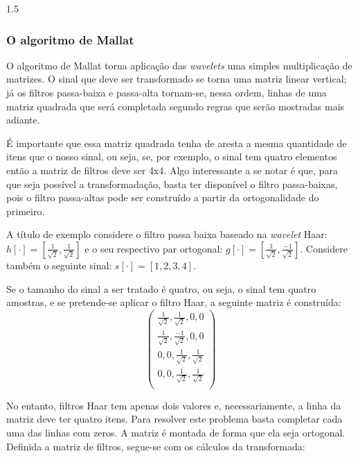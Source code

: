 \documentclass[a4paper,12pt,openright,oneside]{book}
\newenvironment{myenv}[1]
{\begin{spacing}{#1}}
	{\end{spacing}}
\begin{document}
\begin{myenv}{1.5}
\subsubsection{O algoritmo de Mallat}
\par O algoritmo de Mallat torna aplicação das \textit{wavelets} uma simples multiplicação de matrizes. O sinal que deve ser transformado se torna uma matriz linear vertical; já os filtros passa-baixa e passa-alta tornam-se, nessa ordem, linhas de uma matriz quadrada que será completada segundo regras que serão mostradas mais adiante.
\\
\par É importante que essa matriz quadrada tenha de aresta a mesma quantidade de itens que o nosso sinal, ou seja, se, por exemplo, o sinal tem quatro elementos então a matriz de filtros deve ser 4x4. Algo interessante a se notar é que, para que seja possível a transformadação, basta ter disponível o filtro passa-baixas, pois o filtro passa-altas pode ser construído a partir da ortogonalidade do primeiro.
\\
\par A título de exemplo considere o filtro passa baixa baseado na \textit{wavelet} Haar: $h[\cdot] = [\frac{1}{\sqrt{2}}, \frac{1}{\sqrt{2}}]$ e o seu respectivo par ortogonal: $g[\cdot] = [\frac{1}{\sqrt{2}}, \frac{-1}{\sqrt{2}}].$ Considere também o seguinte sinal: $s[\cdot] = [1,2,3,4].$
\\
\par Se o tamanho do sinal a ser tratado é quatro, ou seja, o sinal tem quatro amostras, e se pretende-se aplicar o filtro Haar, a seguinte matriz é construída:
\begin{equation}
\begin{pmatrix}
\frac{1}{\sqrt{2}}, \frac{1}{\sqrt{2}}, 0, 0\\
\frac{1}{\sqrt{2}}, \frac{-1}{\sqrt{2}}, 0, 0\\
0, 0, \frac{1}{\sqrt{2}}, \frac{1}{\sqrt{2}}\\
0, 0, \frac{1}{\sqrt{2}}, \frac{1}{\sqrt{2}}\\
\end{pmatrix} 
\end{equation}
\par No entanto, filtros Haar tem apenas dois valores e, necessariamente, a linha da matriz deve ter quatro itens. Para resolver este problema basta completar cada uma das linhas com zeros. A matriz é montada de forma que ela seja ortogonal. Definida a matriz de filtros, segue-se com os cálculos da transformada:

\end{myenv}
\end{document}
